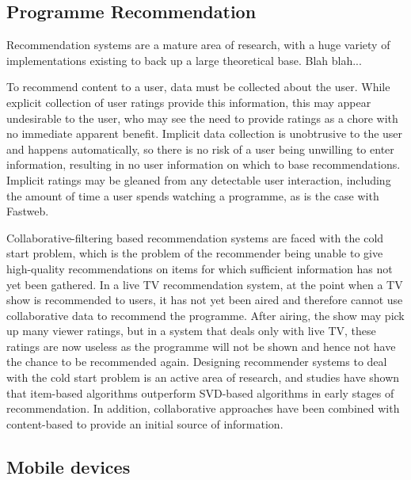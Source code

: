	\subsection{Programme Recommendation}

	Recommendation systems are a mature area of research, with a huge variety of implementations existing to back up a large theoretical base. Blah blah...

	To recommend content to a user, data must be collected about the user. While explicit collection of user ratings provide this information, this may appear undesirable to the user, who may see the need to provide ratings as a chore with no immediate apparent benefit. Implicit data collection is unobtrusive to the user and happens automatically, so there is no risk of a user being unwilling to enter information, resulting in no user information on which to base recommendations. Implicit ratings may be gleaned from any detectable user interaction, including the amount of time a user spends watching a programme, as is the case with Fastweb\citep{recommender-systems-handbook}.


	Collaborative-filtering based recommendation systems are faced with the cold start problem, which is the problem of the recommender being unable to give high-quality recommendations on items for which sufficient information has not yet been gathered. In a live TV recommendation system, at the point when a TV show is recommended to users, it has not yet been aired and therefore cannot use collaborative data to recommend the programme. After airing, the show may pick up many viewer ratings, but in a system that deals only with live TV, these ratings are now useless as the programme will not be shown and hence not have the chance to be recommended again. Designing recommender systems to deal with the cold start problem is an active area of research, and studies have shown that item-based algorithms outperform SVD-based algorithms in early stages of recommendation\citep{cold-start-problem}. In addition, collaborative approaches have been combined with content-based to provide an initial source of information\citep{generative_models}.

	\subsection{Mobile devices}
